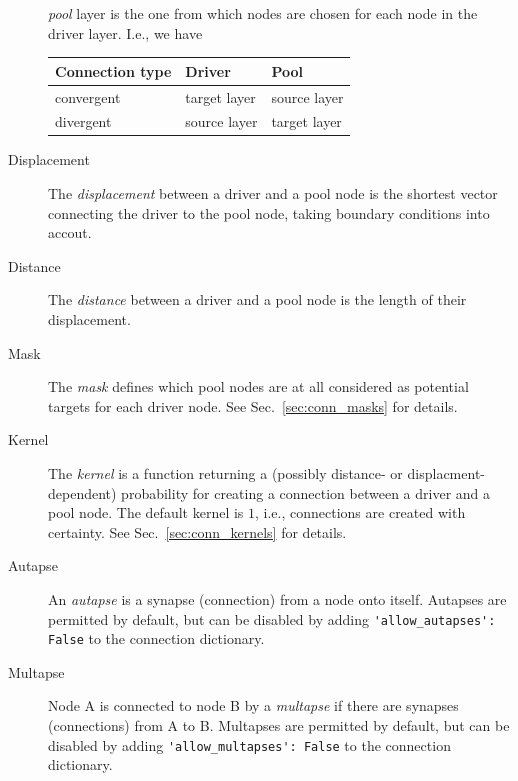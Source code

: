 \documentclass[a4paper,12pt]{report}
\begin{document}
\begin{description}
  \emph{pool} layer is the one from which nodes are chosen for each
  node in the driver layer. I.e., we have\\
  \begin{tabular}{l||l|l}
  Connection type  & Driver & Pool \\\hline\hline
  convergent  & target layer & source layer \\\hline
  divergent   & source layer & target layer
  \end{tabular}
\item[Displacement\index{displacement}] The \emph{displacement}
  between a driver and a pool node is the shortest vector connecting
  the driver to the pool node, taking
  boundary conditions into accout.
\item[Distance\index{distance}] The \emph{distance} between a driver
  and a pool node is the length of their displacement.
\item[Mask\index{mask}] The \emph{mask} defines which pool nodes are
  at all considered as potential targets for each driver node. See
  Sec.~\ref{sec:conn_masks} for details.
\item[Kernel\index{kernel}] The \emph{kernel} is a function returning
  a (possibly distance- or displacment-dependent) 
  probability for creating a connection between a driver and a pool
  node. The default kernel is $1$, i.e., connections are created with
  certainty. See Sec.~\ref{sec:conn_kernels} for details.
\item[Autapse\index{autapse}] An \emph{autapse} is a synapse (connection) from a
  node onto itself. Autapses are permitted by default, but can be
  disabled by adding \lstinline!'allow_autapses': False! to the
  connection dictionary.
\item[Multapse\index{multapse}] Node A is connected to node B by a
  \emph{multapse} if there are synapses (connections) from A to
  B. Multapses are permitted by default, but can be disabled by adding
  \lstinline!'allow_multapses': False! to the connection dictionary.
\end{description}
\end{document}
